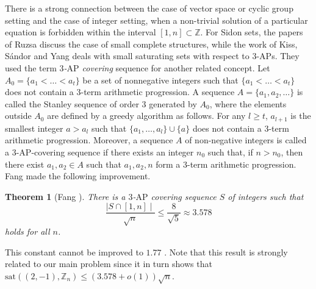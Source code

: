 \documentclass[11pt]{article}
\numberwithin{table}{section}
\newcommand{\F}{{\mathbb F}}
\newcommand{\sat}{\mathrm{sat}}
\newtheorem{theorem}{Theorem}[section]
\newtheorem{prop}[theorem]{\bf Proposition}
\theoremstyle{definition}
\begin{document}
	
	
	There is a strong connection between  the case of vector space or cyclic group setting 
	and the case of integer setting, when  a non-trivial solution of a particular equation is forbidden within the interval
	$[1,n]\subset \mathbb{Z}$. %
	For Sidon sets, the papers of Ruzsa \cite{Ruzsa2, Ruzsa} discuss the case of small complete structures, while the  work of Kiss, Sándor and Yang \cite{SandorCs} deals with small saturating sets with respect to $3$-$\mathrm{AP}$s. 
	They used the term \textit{$3$-$\mathrm{AP}$ covering} sequence for another related concept. 
	Let $A_0=\{a_1<\ldots<a_t\}$
	be a set of nonnegative integers such that $\{a_1<\ldots<a_t\}$
	does not contain a 3-term arithmetic progression. A sequence $A=\{a_1,a_2,\ldots\}$
	is called the Stanley sequence of order  $3$ generated by $A_0$, where  the elements outside $A_0$
	are defined by a greedy algorithm as follows. For any $l\ge t$, $a_{l+1}$  is the smallest integer $a>a_l$
	such that $\{a_1,\ldots,a_l\}\cup\{a\}$
	does not contain a $3$-term arithmetic progression. Moreover, a sequence $A$ of non-negative integers is called a $3$-$\mathrm{AP}$-covering sequence if there exists an integer $n_0$
	such that, if $n>n_0$, then there exist $a_1, a_2 \in A$ such that $a_1, a_2, n$
	form a $3$-term arithmetic progression.
	Fang \cite{Fang} made the following improvement.
	
	
	\begin{theorem}[Fang \cite{Fang}]\label{fange}
		There is a $3$-$\mathrm{AP}$ covering sequence $S$ of integers such that  $$ \frac{ \mid S \cap [1,n]\mid}{\sqrt{n}}\leq \frac{8}{\sqrt{5}} \approx 3.578$$ holds for all $n$. 
	\end{theorem}
	\noindent This constant cannot be improved to $1.77$ \cite{SandorCs}.
	Note that this  result is strongly related to our main problem since it in turn shows that  $\sat((2,-1), \mathbb{Z}_n )\leq (3.578+o(1))\sqrt{n}$.
	
\end{document}
